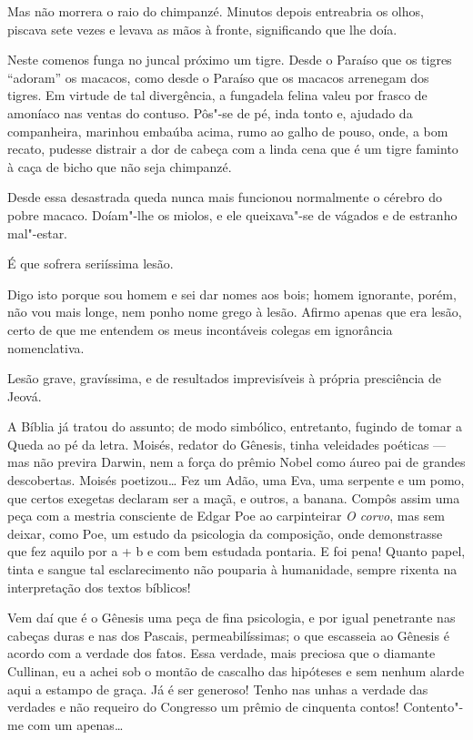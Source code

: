 Mas não morrera o raio do chimpanzé. Minutos depois entreabria os olhos,
piscava sete vezes e levava as mãos à fronte, significando que lhe doía.

Neste comenos funga no juncal próximo um tigre. Desde o Paraíso que os
tigres ``adoram'' os macacos, como desde o Paraíso que os macacos
arrenegam dos tigres. Em virtude de tal divergência, a fungadela felina
valeu por frasco de amoníaco nas ventas do contuso. Pôs"-se de pé, inda
tonto e, ajudado da companheira, marinhou embaúba acima, rumo ao galho
de pouso, onde, a bom recato, pudesse distrair a dor de cabeça com a
linda cena que é um tigre faminto à caça de bicho que não seja
chimpanzé.

Desde essa desastrada queda nunca mais funcionou normalmente o cérebro
do pobre macaco. Doíam"-lhe os miolos, e ele queixava"-se de vágados e de
estranho mal"-estar.

É que sofrera seriíssima lesão.

Digo isto porque sou homem e sei dar nomes aos bois; homem ignorante,
porém, não vou mais longe, nem ponho nome grego à lesão. Afirmo apenas
que era lesão, certo de que me entendem os meus incontáveis colegas em
ignorância nomenclativa.

Lesão grave, gravíssima, e de resultados imprevisíveis à própria
presciência de Jeová.

A Bíblia já tratou do assunto; de modo simbólico, entretanto, fugindo de
tomar a Queda ao pé da letra. Moisés, redator do Gênesis, tinha
veleidades poéticas --- mas não previra Darwin, nem a força do prêmio
Nobel como áureo pai de grandes descobertas. Moisés poetizou\ldots{} Fez um
Adão, uma Eva, uma serpente e um pomo, que certos exegetas declaram ser
a maçã, e outros, a banana. Compôs assim uma peça com a mestria
consciente de Edgar Poe ao carpinteirar \emph{O corvo}, mas sem deixar,
como Poe, um estudo da psicologia da composição, onde demonstrasse que
fez aquilo por a + b e com bem estudada pontaria. E foi pena! Quanto
papel, tinta e sangue tal esclarecimento não pouparia à humanidade,
sempre rixenta na interpretação dos textos bíblicos!

Vem daí que é o Gênesis uma peça de fina psicologia, e por igual
penetrante nas cabeças duras e nas dos Pascais, permeabilíssimas; o que
escasseia ao Gênesis é acordo com a verdade dos fatos. Essa verdade,
mais preciosa que o diamante Cullinan, eu a achei sob o montão de
cascalho das hipóteses e sem nenhum alarde aqui a estampo de graça. Já é
ser generoso! Tenho nas unhas a verdade das verdades e não requeiro do
Congresso um prêmio de cinquenta contos! Contento"-me com um apenas\ldots{}

